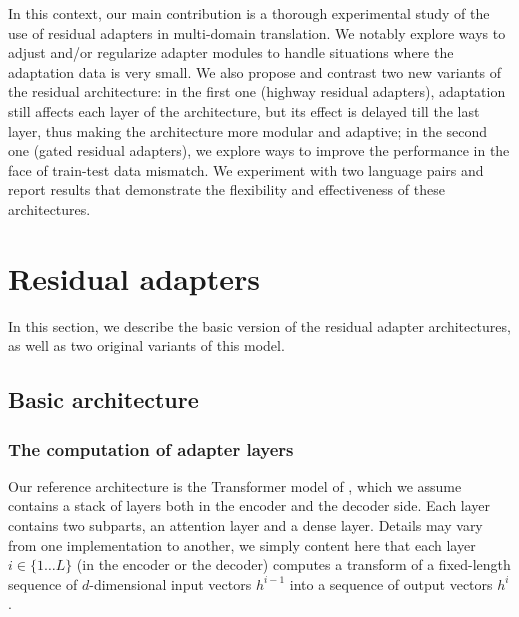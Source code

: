 \documentclass[11pt,a4paper]{article}
\newcommand{\fyDone}[1]{\done[FY]\Todo[FY:]{\textcolor{orange}{#1}}}
\newcommand{\fyFuture}[1]{\done[FY]\Todo[FY:]{\textcolor{red}{#1}}}
\begin{document}
In this context, our main contribution is a thorough experimental study of the use of residual adapters in multi-domain translation. We notably explore ways to adjust and/or regularize adapter modules to handle situations where the adaptation data is very small. We also propose and contrast two new variants of the residual architecture: in the first one (highway residual adapters), adaptation still affects each layer of the architecture, but its effect is delayed till the last layer, thus making the architecture more modular and adaptive; in the second one (gated residual adapters), we explore ways to improve the performance in the face of train-test data mismatch. We experiment with two language pairs and report results that demonstrate the flexibility and effectiveness of these architectures. 
\fyDone{One bit of a conclusion here}\fyFuture{Build a proper training scenario for these two conditions}

\section{Residual adapters \label{sec:res}}
In this section, we describe the basic version of the residual adapter architectures, as well as two original variants of this model.

\subsection{Basic architecture \label{ssec:architecture}}
\fyDone{More contexts and notations from the transformer}\fyDone{Encoder / decoder layers}

\subsubsection{The computation of adapter layers}
Our reference architecture is the Transformer model of \cite{Vaswani17attention}, which we assume contains a stack of layers both in the encoder and the decoder side. Each layer contains two subparts, an attention layer and a dense layer. Details may vary from one implementation to another, we simply content here that each layer $i \in \{1 \dots L\}$ (in the encoder or the decoder) computes a transform of a fixed-length sequence of $d$-dimensional input vectors $h^{i-1}$ into a sequence of output vectors $h^{i}$.
\end{document}
